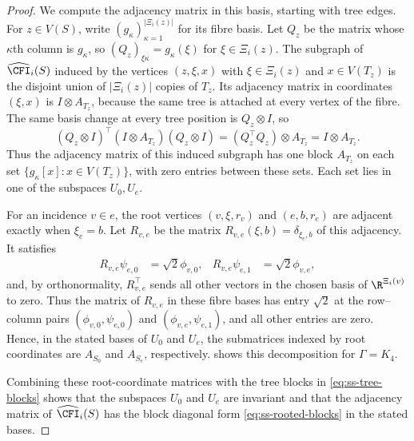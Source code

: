 \begin{proof}
We compute the adjacency matrix in this basis, starting with tree edges.
For $z\in V(S)$, write $(g_\kappa)_{\kappa=1}^{|\Xi_i(z)|}$ for its fibre basis.
Let $Q_z$ be the matrix whose $\kappa$th column is $g_\kappa$, so
$(Q_z)_{\xi\kappa}=g_\kappa(\xi)$ for $\xi\in \Xi_i(z)$.
The subgraph of $\widehat{\CFI}_i(S)$ induced by the vertices $(z,\xi,x)$ with
$\xi\in \Xi_i(z)$ and $x\in V(T_z)$ is the disjoint union of $|\Xi_i(z)|$ copies
of $T_z$. Its adjacency matrix in coordinates $(\xi,x)$ is $I\otimes A_{T_z}$,
because the same tree is attached at every vertex of the fibre.
The same basis change at every tree position is $Q_z\otimes I$, so
\begin{equation}\label{eq:ss-tree-blocks}
 (Q_z\otimes I)^{\top}(I\otimes A_{T_z})(Q_z\otimes I)
 =(Q_z^{\top}Q_z)\otimes A_{T_z}
 =I\otimes A_{T_z}.
\end{equation}
Thus the adjacency matrix of this induced subgraph has one block $A_{T_z}$
on each set $\{g_\kappa[x]:x\in V(T_z)\}$, with zero entries between these sets.
Each set lies in one of the subspaces $U_0,U_e$.

For an incidence $v\in e$, the root vertices
$(v,\xi,r_v)$ and $(e,b,r_e)$ are adjacent exactly when $\xi_e=b$.
Let $R_{v,e}$ be the matrix $R_{v,e}(\xi,b)=\delta_{\xi_e,b}$ of
this adjacency. It satisfies
\begin{equation}\label{eq:ss-fourier}
 \begin{aligned}
 R_{v,e}\psi_{e,0}&=\sqrt2\phi_{v,0}, &
 R_{v,e}\psi_{e,1}&=\sqrt2\phi_{v,e},
 \end{aligned}
\end{equation}
and, by orthonormality, $R_{v,e}^{\top}$ sends all other vectors
in the chosen basis of $\R^{\Xi_i(v)}$ to zero.
Thus the matrix of $R_{v,e}$ in these fibre bases has entry $\sqrt2$
at the row--column pairs $(\phi_{v,0},\psi_{e,0})$ and
$(\phi_{v,e},\psi_{e,1})$, and all other entries are zero.
Hence, in the stated bases of $U_0$ and $U_e$,
the submatrices indexed by root coordinates are $A_{S_0}$ and $A_{S_e}$,
respectively.  shows this decomposition for
$\Gamma=K_4$.


Combining these root-coordinate matrices with the tree blocks in
\cref{eq:ss-tree-blocks} shows that the subspaces $U_0$ and $U_e$
are invariant and that the adjacency matrix of $\widehat{\CFI}_i(S)$ has the block diagonal form
\cref{eq:ss-rooted-blocks} in the stated bases.
\end{proof}

